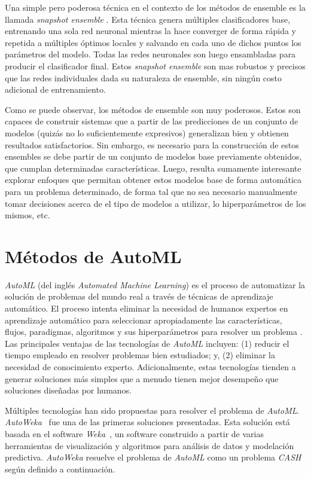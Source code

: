 Una simple pero poderosa técnica en el contexto de los métodos de ensemble es la llamada \textit{snapshot ensemble} \parencite{huang17snapshot}. Esta técnica genera múltiples clasificadores base, entrenando una sola red neuronal mientras la hace converger de forma rápida y repetida a múltiples óptimos locales y salvando en cada uno de dichos puntos los parámetros del modelo. Todas las redes neuronales son luego ensambladas para producir el clasificador final. Estos \textit{snapshot ensemble} son mas robustos y precisos que las redes individuales dada su naturaleza de ensemble, sin ningún costo adicional de entrenamiento.

Como se puede observar, los métodos de ensemble son muy poderosos.
Estos son capaces de construir sistemas que a partir de las predicciones de un conjunto de modelos (quizás no lo suficientemente expresivos) generalizan bien y obtienen resultados satisfactorios.
Sin embargo, es necesario para la construcción de estos ensembles se debe partir de un conjunto de modelos base previamente obtenidos, que cumplan determinadas características.
Luego, resulta sumamente interesante explorar enfoques que permitan obtener estos modelos base de forma automática para un problema determinado, de forma tal que no sea necesario manualmente tomar decisiones acerca de el tipo de modelos a utilizar, lo hiperparámetros de los mismos, etc. 

\section{Métodos de AutoML}\label{section:automl}

\emph{AutoML} (del inglés \textit{Automated Machine Learning}) es el proceso de automatizar la solución de problemas del mundo real a través de técnicas de aprendizaje automático.
El proceso intenta eliminar la necesidad de humanos expertos en aprendizaje automático para seleccionar apropiadamente las características, flujos, paradigmas, algoritmos y sus hiperparámetros para resolver un problema \parencite{Dimitrakakis_Liu_Parkes_Radanovic_2019}.
Las principales ventajas de las tecnologías de \emph{AutoML} incluyen:
(1) reducir el tiempo empleado en resolver problemas bien estudiados; y,
(2) eliminar la necesidad de conocimiento experto.
Adicionalmente, estas tecnologías tienden a generar soluciones más simples que a menudo tienen mejor desempeño que soluciones diseñadas por humanos.

Múltiples tecnologías han sido propuestas para resolver el problema de \emph{AutoML}. \emph{AutoWeka}~\parencite{autoweka} fue una de las primeras soluciones presentadas.
Esta solución está basada en el software \emph{Weka}~\parencite{weka}, un software construido a partir de varias herramientas de visualización y algoritmos para análisis de datos y modelación predictiva. \emph{AutoWeka} resuelve el problema de \emph{AutoML} como un problema \emph{CASH} según definido a continuación.

